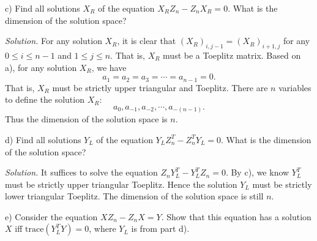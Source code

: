 \documentclass[12pt]{article}
\theoremstyle{plain}
\begin{document}
c) Find all solutions $X_R$ of the equation $X_RZ_n - Z_nX_R = 0$. What is the dimension of the solution space?

{\it Solution.} For any solution $X_R$, it is clear that $(X_R)_{i,j-1} = (X_R)_{i+1,j}$ for any $0\leq i \leq n-1$ and $1\leq j\leq n$. That is, $X_R$ must be a Toeplitz matrix.
Based on a), for any solution $X_R$, we have 
$$a_1 = a_2 = a_3 = \cdots = a_{n-1} = 0.$$
That is, $X_R$ must be strictly upper triangular and Toeplitz. There are $n$ variables to define the solution $X_R$:
$$a_0, a_{-1}, a_{-2}, \cdots, a_{-(n-1)}.$$
Thus the dimension of the solution space is $n$.

d) Find all solutions $Y_L$ of the equation $Y_LZ_n^T - Z_n^TY_L = 0$. What is the dimension of the solution space?

{\it Solution.} It suffices to solve the equation $Z_nY_L^T - Y_L^T Z_n = 0$. By c), we know $Y_L^T$ must be strictly upper triangular Toeplitz. Hence the solution $Y_L$ must be strictly lower triangular Toeplitz. The dimension of the solution space is still $n$.

e) Consider the equation $XZ_n - Z_nX = Y$. Show that this equation has a solution $X$ iff $\mathrm{trace}(Y_L^TY)=0$, where $Y_L$ is from part d).
\end{document}
